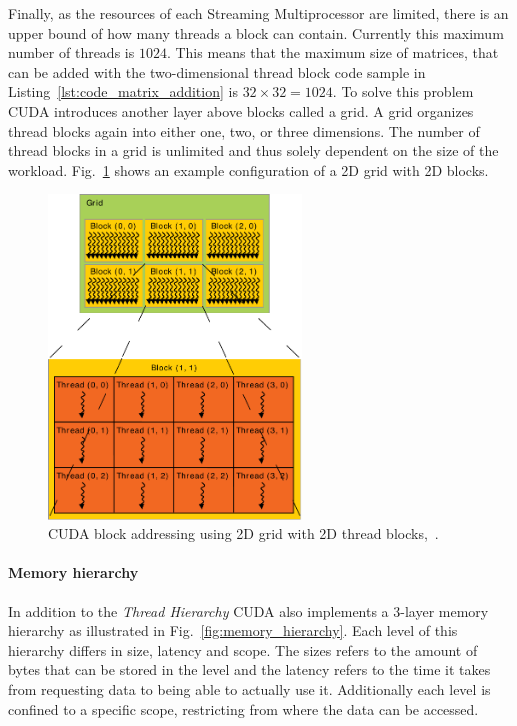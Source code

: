 Finally, as the resources of each Streaming Multiprocessor are limited, there is an upper bound of how many threads a block can contain. Currently this maximum number of threads is $1024$. This means that the maximum size of matrices, that can be added with the two-dimensional thread block code sample in Listing~\ref{lst:code_matrix_addition} is $32\times32 = 1024$. To solve this problem CUDA introduces another layer above blocks called a grid. A grid organizes thread blocks again into either one, two, or three dimensions. The number of thread blocks in a grid is unlimited and thus solely dependent on the size of the workload. Fig.~\ref{fig:grid_blocks} shows an example configuration of a 2D grid with 2D blocks.

\begin{figure}[!htbp]
  \centering
  \includegraphics[width=0.6\textwidth]{img/grid_blocks.pdf}
  \caption[CUDA block addressing using 2D grid with 2D thread blocks.]{CUDA block addressing using 2D grid with 2D thread blocks,~\cite{CudaProgrammingGuide}.}
  \label{fig:grid_blocks}
\end{figure}

\paragraph{Memory hierarchy}

In addition to the \emph{Thread Hierarchy} CUDA also implements a 3-layer memory hierarchy as illustrated in Fig.~\ref{fig:memory_hierarchy}. Each level of this hierarchy differs in size, latency and scope. The sizes refers to the amount of bytes that can be stored in the level and the latency refers to the time it takes from requesting data to being able to actually use it. Additionally each level is confined to a specific scope, restricting from where the data can be accessed.

